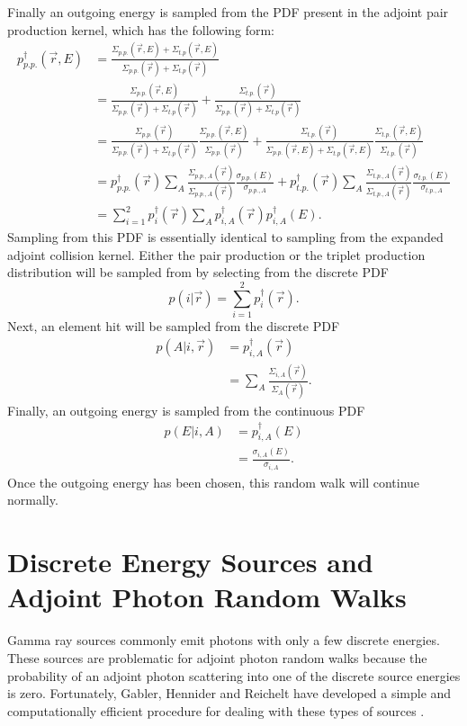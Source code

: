 Finally an outgoing energy is sampled from the PDF present in the adjoint
pair production kernel, which has the following form:
\begin{align}
  p_{p.p.}^{\dagger}(\vec{r},E) & = 
  \frac{\Sigma_{p.p.}(\vec{r},E)+\Sigma_{t.p}(\vec{r},E)}
  {\Sigma_{p.p.}(\vec{r})+\Sigma_{t.p}(\vec{r})} \nonumber \\
  & = \frac{\Sigma_{p.p.}(\vec{r},E)}
  {\Sigma_{p.p.}(\vec{r})+\Sigma_{t.p}(\vec{r})} +
  \frac{\Sigma_{t.p.}(\vec{r})}
  {\Sigma_{p.p.}(\vec{r})+\Sigma_{t.p}(\vec{r})} \nonumber \\
  & = \frac{\Sigma_{p.p.}(\vec{r})}
  {\Sigma_{p.p.}(\vec{r})+\Sigma_{t.p}(\vec{r})} 
  \frac{\Sigma_{p.p.}(\vec{r},E)}{\Sigma_{p.p.}(\vec{r})} +
  \frac{\Sigma_{t.p.}(\vec{r})}
  {\Sigma_{p.p.}(\vec{r},E)+\Sigma_{t.p}(\vec{r},E)}
  \frac{\Sigma_{t.p.}(\vec{r},E)}{\Sigma_{t.p.}(\vec{r})} \nonumber \\
  & = p_{p.p.}^{\dagger}(\vec{r}) \sum_A
  \frac{\Sigma_{p.p.,A}(\vec{r})}{\Sigma_{p.p.,A}(\vec{r})}
  \frac{\sigma_{p.p.}(E)}{\sigma_{p.p.,A}} +
  p_{t.p.}^{\dagger}(\vec{r}) \sum_A
  \frac{\Sigma_{t.p.,A}(\vec{r})}{\Sigma_{t.p.,A}(\vec{r})}
  \frac{\sigma_{t.p.}(E)}{\sigma_{t.p.,A}} \nonumber \\
  & = \sum_{i=1}^2 p_i^{\dagger}(\vec{r})\sum_A p_{i,A}^{\dagger}(\vec{r})
  p_{i,A}^{\dagger}(E).
\end{align}
Sampling from this PDF is essentially identical to sampling from the expanded
adjoint collision kernel. Either the pair production or the triplet production 
distribution will be sampled from by selecting from the discrete PDF
\begin{equation}
  p(i|\vec{r}) = \sum_{i=1}^2 p_i^{\dagger}(\vec{r}).
\end{equation}
Next, an element hit will be sampled from the discrete PDF
\begin{align}
  p(A|i,\vec{r}) & = p_{i,A}^{\dagger}(\vec{r}) \nonumber \\
  & = \sum_A \frac{\Sigma_{i,A}(\vec{r})}{\Sigma_{A}(\vec{r})}.
\end{align}
Finally, an outgoing energy is sampled from the continuous PDF 
\begin{align}
  p(E|i,A) & = p_{i,A}^{\dagger}(E) \nonumber \\
  & = \frac{\sigma_{i,A}(E)}{\sigma_{i,A}}.
\end{align}
Once the outgoing energy has been chosen, this random walk will continue 
normally.

\section{Discrete Energy Sources and Adjoint Photon Random Walks}
Gamma ray sources commonly emit photons with only a few discrete energies.
These sources are problematic for adjoint photon random walks because the
probability of an adjoint photon scattering into one of the discrete source
energies is zero. Fortunately, Gabler, Hennider and Reichelt have developed
a simple and computationally efficient procedure for dealing with these types
of sources \citep{gabler_amos_2006}.

